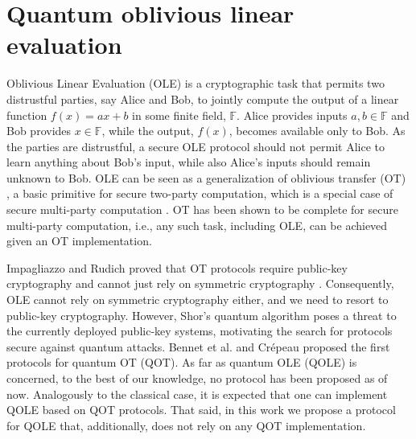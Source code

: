 


%

\chapter{Quantum oblivious linear evaluation}
\label{ch:QOLE}

Oblivious Linear Evaluation (OLE) is a cryptographic task that permits two distrustful parties, say Alice and Bob, to jointly compute the output of a linear function $f(x)=ax+b$ in some finite field, $\mathbb{F}$. Alice provides inputs $a, b\in\mathbb{F}$ and Bob provides $x\in\mathbb{F}$, while the output, $f(x)$, becomes available only to Bob. As the parties are distrustful, a secure OLE protocol should not permit Alice to learn anything about Bob's input, while also Alice's inputs should remain unknown to Bob.  OLE can be seen as a generalization of oblivious transfer (OT) \cite{Rabin81}, a basic primitive for secure two-party computation, which is a special case of secure multi-party computation \cite{Goldreichbook04,CCD88,Canetti00MPC}. OT has been shown to be complete  for secure multi-party computation, i.e., any such task, including OLE, can be achieved given an OT implementation. 
 
Impagliazzo and Rudich proved that OT protocols require public-key cryptography and cannot just rely on symmetric cryptography \cite{IR89}. Consequently, OLE cannot rely on symmetric cryptography either, and we need to resort to public-key cryptography.  However, Shor's  quantum algorithm \cite{Sho95}  poses a threat to the currently deployed public-key systems, motivating the search for protocols secure against quantum attacks. Bennet et al. \cite{BBCS92} and Cr{\'e}peau \cite{C94} proposed the first protocols for quantum OT (QOT). As far as quantum OLE (QOLE) is concerned, to the best of our knowledge, no protocol has been proposed as of now.
Analogously to the classical case, it is expected that one can implement QOLE based on QOT protocols. That said, in this work we propose a protocol for QOLE that, additionally, does not rely on any QOT implementation.

